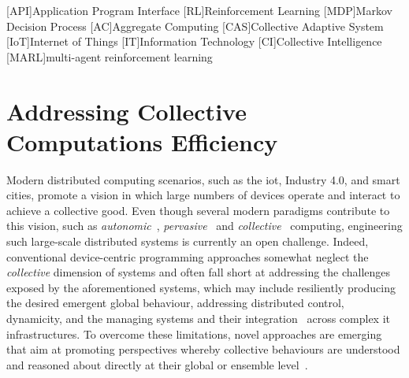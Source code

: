 
\newcommand{\export}{export}
\newcommand{\round}{round}
\newcommand{\RS}{\mathcal{S}}
\newcommand{\RA}{\mathcal{A}}
\newcommand{\RP}{\mathcal{P}}
\newcommand{\RR}{\mathcal{R}}
\newcommand{\RE}{\mathbb{E}}
\newcommand{\decision}[1]{{\color{red} #1}}
\newcommand{\mtext}[1]{\text{\texttt{#1}}}
\newcommand{\revision}[1]{{#1}}
\newenvironment{iequation}{\(}{\). }
\def\tablename{Table}
\sloppypar
[API]{Application Program Interface}
[RL]{Reinforcement Learning}
[MDP]{Markov Decision Process}
[AC]{Aggregate Computing}
[CAS]{Collective Adaptive System}
[IoT]{Internet of Things}
[IT]{Information Technology}
[CI]{Collective Intelligence}
[MARL]{multi-agent reinforcement learning}
\newcommand{\scafiinline}[1]{\lstinline[language=scafi]$#1$}


\chapter{Addressing Collective Computations Efficiency}
\minitoc%


\lstset{language=scafi}

Modern distributed computing scenarios, such as the \ac{iot}, Industry 4.0, and smart cities, promote a vision in which large numbers of devices operate and interact to achieve a collective good.
%
Even though several modern paradigms contribute to this vision, such as \emph{autonomic}~\cite{DBLP:journals/computer/KephartC03}, \emph{pervasive}~\cite{DBLP:journals/wc/Satyanarayanan01} and \emph{collective}~\cite{DBLP:journals/computer/Abowd16} computing, engineering such large-scale distributed systems is currently an open challenge. 
%
Indeed, conventional device-centric programming approaches somewhat neglect the \emph{collective} dimension of systems and often fall short at addressing the challenges exposed by the aforementioned systems, which may include resiliently producing the desired emergent global behaviour, 
addressing distributed control, dynamicity, and the managing systems and their integration~\cite{DBLP:journals/fgcs/BellmanBDEGLLNP21} across complex \ac{it} infrastructures.
%
To overcome these limitations, novel approaches are emerging that aim at promoting perspectives whereby collective behaviours are understood and reasoned about directly at their global or ensemble level~\cite{DBLP:journals/sttt/NicolaJW20,DBLP:conf/birthday/BucchiaroneM19,DBLP:journals/sttt/BuresGHPKVK20,DBLP:journals/jlap/ViroliBDACP19}.


